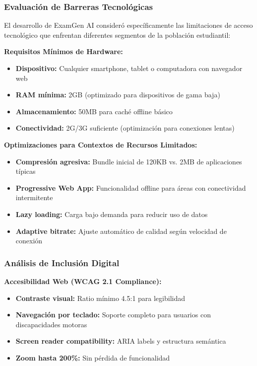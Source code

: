 \documentclass[12pt,a4paper]{report}
\begin{document}
\subsubsection{Evaluación de Barreras Tecnológicas}

El desarrollo de ExamGen AI consideró específicamente las limitaciones de acceso tecnológico que enfrentan diferentes segmentos de la población estudiantil:

\textbf{Requisitos Mínimos de Hardware:}
\begin{itemize}
\item \textbf{Dispositivo:} Cualquier smartphone, tablet o computadora con navegador web
\item \textbf{RAM mínima:} 2GB (optimizado para dispositivos de gama baja)
\item \textbf{Almacenamiento:} 50MB para caché offline básico
\item \textbf{Conectividad:} 2G/3G suficiente (optimización para conexiones lentas)
\end{itemize}

\textbf{Optimizaciones para Contextos de Recursos Limitados:}
\begin{itemize}
\item \textbf{Compresión agresiva:} Bundle inicial de 120KB vs. 2MB de aplicaciones típicas
\item \textbf{Progressive Web App:} Funcionalidad offline para áreas con conectividad intermitente
\item \textbf{Lazy loading:} Carga bajo demanda para reducir uso de datos
\item \textbf{Adaptive bitrate:} Ajuste automático de calidad según velocidad de conexión
\end{itemize}

\subsubsection{Análisis de Inclusión Digital}

\textbf{Accesibilidad Web (WCAG 2.1 Compliance):}
\begin{itemize}
\item \textbf{Contraste visual:} Ratio mínimo 4.5:1 para legibilidad
\item \textbf{Navegación por teclado:} Soporte completo para usuarios con discapacidades motoras
\item \textbf{Screen reader compatibility:} ARIA labels y estructura semántica
\item \textbf{Zoom hasta 200\%:} Sin pérdida de funcionalidad
\end{itemize}
\end{document}
